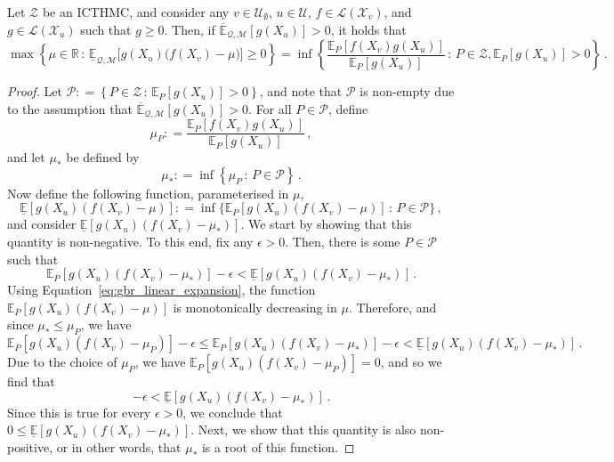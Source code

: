 \documentclass[twoside,11pt]{article}
\newcommand{\reals}{\mathbb{R}}
\newcommand{\states}{\mathcal{X}}
\newcommand{\lexp}{\underline{\mathbb{E}}_{\rateset,\mathcal{M}}}
\newcommand{\uexp}{\overline{\mathbb{E}}_{\rateset,\mathcal{M}}}
\newcommand{\gambles}{\mathcal{L}}
\newcommand{\rateset}{\mathcal{Q}}
\newcommand{\coloneqq}{:\!=}
\begin{document}
\begin{lemma}\label{lemma:general_regular_extension}
Let $\mathcal{Z}$ be an ICTHMC, and consider any $v\in\mathcal{U}_\emptyset$, $u\in\mathcal{U}$, $f\in\gambles(\states_v)$, and $g\in\gambles(\states_u)$ such that $g\geq 0$. Then, if $\uexp[g(X_u)]>0$, it holds that
\begin{equation*}
\max\left\{\mu\in\reals\,:\, \lexp\bigl[g(X_u)\bigl(f(X_v) - \mu\bigr)\bigr] \geq 0\right\} = \inf\left\{ \frac{\mathbb{E}_P[f(X_v)g(X_u)]}{\mathbb{E}_P[g(X_u)]}\,:\,P\in\mathcal{Z}, \mathbb{E}_P[g(X_u)]>0 \right\}\,.
\end{equation*}
\end{lemma}
\begin{proof}
Let $\mathcal{P}\coloneqq \left\{ P\in\mathcal{Z}\,:\, \mathbb{E}_P[g(X_u)] > 0\right\}$, and note that $\mathcal{P}$ is non-empty due to the assumption that $\uexp[g(X_u)]>0$. For all $P\in\mathcal{P}$, define
\begin{equation*}
\mu_P \coloneqq \frac{\mathbb{E}_P[f(X_v)g(X_u)]}{\mathbb{E}_P[g(X_u)]}\,,
\end{equation*}
and let $\mu_*$ be defined by
\begin{equation*}
\mu_* \coloneqq \inf\left\{\mu_P\,:\,P\in\mathcal{P} \right\}\,.
\end{equation*}
Now define the following function, parameterised in $\mu$,
\begin{equation*}
\underline{\mathbb{E}}[g(X_u)(f(X_v) - \mu)] \coloneqq \inf\{\mathbb{E}_P[g(X_u)(f(X_v) - \mu)]\,:\,P\in\mathcal{P} \}\,,
\end{equation*}
and consider $\underline{\mathbb{E}}[g(X_u)(f(X_v) - \mu_*)]$. We start by showing that this quantity is non-negative. To this end, fix any $\epsilon>0$. Then, there is some $P\in\mathcal{P}$ such that
\begin{equation*}
\mathbb{E}_P[g(X_u)(f(X_v) - \mu_*)] - \epsilon < \underline{\mathbb{E}}[g(X_u)(f(X_v) - \mu_*)]\,.
\end{equation*}
Using Equation~\eqref{eq:gbr_linear_expansion}, the function $\mathbb{E}_P[g(X_u)(f(X_v) - \mu)]$ is monotonically decreasing in $\mu$. Therefore, and since $\mu_*\leq \mu_P$, we have
\begin{equation*}
\mathbb{E}_P[g(X_u)(f(X_v) - \mu_P)] - \epsilon \leq \mathbb{E}_P[g(X_u)(f(X_v) - \mu_*)] - \epsilon < \underline{\mathbb{E}}[g(X_u)(f(X_v) - \mu_*)]\,.
\end{equation*}
Due to the choice of $\mu_P$, we have $\mathbb{E}_P[g(X_u)(f(X_v) - \mu_P)]=0$, and so we find that
\begin{equation*}
-\epsilon < \underline{\mathbb{E}}[g(X_u)(f(X_v) - \mu_*)]\,.
\end{equation*}
Since this is true for every $\epsilon>0$, we conclude that $0\leq \underline{\mathbb{E}}[g(X_u)(f(X_v) - \mu_*)]$. Next, we show that this quantity is also non-positive, or in other words, that $\mu_*$ is a root of this function. 


\end{proof}
\end{document}
